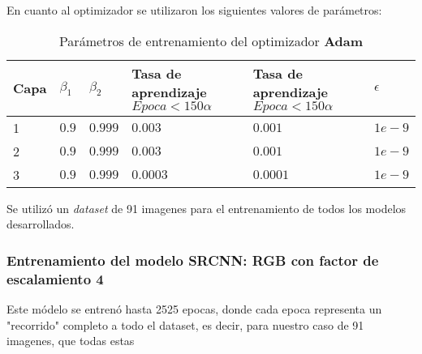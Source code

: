 En cuanto al optimizador se utilizaron los siguientes valores de parámetros:

\begin{table}[H]
    \centering
    \caption{Parámetros de entrenamiento del optimizador \textbf{Adam}}
    \begin{tabular}{|l|l|l|l|l|}
    \hline
    \textbf{Capa} & \textbf{$\beta_1$} & \textbf{$\beta_2$}  & \textbf{Tasa de aprendizaje $Epoca<150$\n$\alpha$} & \textbf{Tasa de aprendizaje $Epoca<150$\n$\alpha$} & \textbf{$\epsilon$}\\              & $0.9$              & $0.999$             & $0.003$ & $0.001$          & $1e-9$                 \\
    2             & $0.9$              & $0.999$             & $0.003$ & $0.001$          & $1e-9$                 \\
    3             & $0.9$              & $0.999$             & $0.0003$ & $0.0001$        & $1e-9$                 \\ \hline
    \end{tabular}
\end{table}

Se utilizó un \emph{dataset} de 91 imagenes para el entrenamiento de todos los modelos desarrollados.

\subsubsection{Entrenamiento del modelo SRCNN: RGB con factor de escalamiento 4}
Este módelo se entrenó hasta 2525 epocas, donde cada epoca representa un "recorrido" completo a todo el dataset, es decir, para
nuestro caso de 91 imagenes, que todas estas